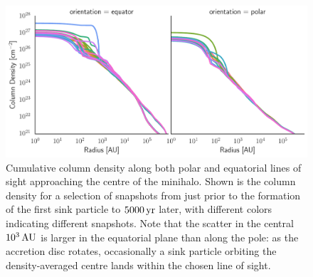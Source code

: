 \documentclass[../thesis.tex]{subfiles}
\begin{document}
\begin{figure}
\begin{center}
\includegraphics[width=\columnwidth]{figures/optical_depth/column_density}
\caption{\label{fig:column_density} Cumulative column density along both polar and equatorial lines of sight approaching the centre of the minihalo.  Shown is the column density for a selection of snapshots from just prior to the formation of the first sink particle to $5000\,\mathrm{yr}$ later, with different colors indicating different snapshots.  Note that the scatter in the central $10^3\,\mathrm{AU}$ is larger in the equatorial plane than along the pole: as the accretion disc rotates, occasionally a sink particle orbiting the density-averaged centre lands within the chosen line of sight.}
\end{center}
\end{figure}

\end{document}
